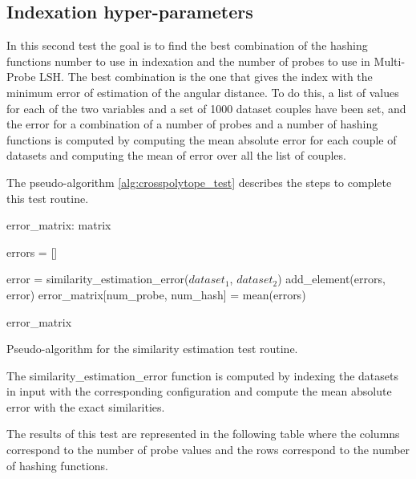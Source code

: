 \subsection{Indexation hyper-parameters}
In this second test the goal is to find the best combination of the
hashing functions number to use in indexation and the number of probes to use in
Multi-Probe LSH. The best combination is the one that gives the index with the
minimum error of estimation of the angular distance. To do this, a list of
values for each of the two variables and a set of 1000 dataset couples have been
set, and the error for a combination of a number of probes and a number of
hashing functions is computed by computing the mean absolute error for each
couple of datasets and computing the mean of error over all the list of couples.

The pseudo-algorithm \ref{alg:crosspolytope_test} describes the steps to
complete this test routine.

\begin{algorithm}[H]
    \SetAlgoLined
    \label{alg:crosspolytope_test}
    error\_matrix: matrix

    {
        errors = []

        {
            error = similarity\_estimation\_error($dataset_1$, $dataset_2$)
            add\_element(errors, error)
        }
        error\_matrix[num\_probe, num\_hash] = mean(errors)
    }

    \Return error\_matrix
    \caption{Pseudo-algorithm for the similarity estimation test routine.}

\end{algorithm}

The similarity\_estimation\_error function is computed by indexing the datasets
in input with the corresponding configuration and compute the mean absolute
error with the exact similarities.

The results of this test are represented in the following table where the
columns correspond to the number of probe values and the rows correspond to the
number of hashing functions.

\hspace{1cm}

